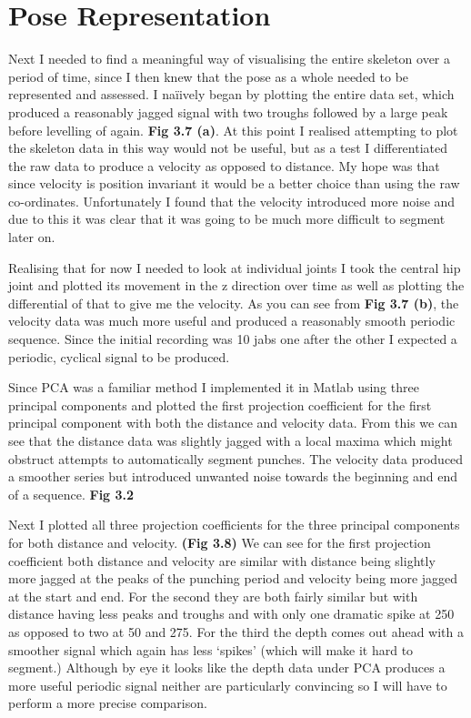 \section{Pose Representation}
Next I needed to find a meaningful way of visualising the entire skeleton over a period of time, since I then knew that the pose as a whole needed to be represented and assessed. I na{\"i}ively began by plotting the entire data set, which produced a reasonably jagged signal with two troughs followed by a large peak before levelling of again. {\bf Fig 3.7 (a)}. At this point I realised attempting to plot the skeleton data in this way would not be useful, but as a test I differentiated the raw data to produce a velocity as opposed to distance. My hope was that since velocity is position invariant it would be a better choice than using the raw co-ordinates. Unfortunately I found that the velocity introduced more noise and due to this it was clear that it was going to be much more difficult to segment later on.

Realising that for now I needed to look at individual joints I took the central hip joint and plotted its movement in the z direction over time as well as plotting the differential of that to give me the velocity. As you can see from {\bf Fig 3.7 (b)}, the velocity data was much more useful and produced a reasonably smooth periodic sequence. Since the initial recording was 10 jabs one after the other I expected a periodic, cyclical signal to be produced.

Since PCA was a familiar method I implemented it in Matlab using three principal components and plotted the first projection coefficient for the first principal component with both the distance and velocity data. From this we can see that the distance data was slightly jagged with a local maxima which might obstruct attempts to automatically segment punches. The velocity data produced a smoother series but introduced unwanted noise towards the beginning and end of a sequence. {\bf Fig 3.2}

Next I plotted all three projection coefficients for the three principal components for both distance and velocity. {\bf (Fig 3.8)} We can see for the first projection coefficient both distance and velocity are similar with distance being slightly more jagged at the peaks of the punching period and velocity being more jagged at the start and end.
For the second they are both fairly similar but with distance having less peaks and troughs and with only one dramatic spike at 250 as opposed to two at 50 and 275.
For the third the depth comes out ahead with a smoother signal which again has less `spikes' (which will make it hard to segment.) Although by eye it looks like the depth data under PCA produces a more useful periodic signal neither are particularly convincing so I will have to perform a more precise comparison.

